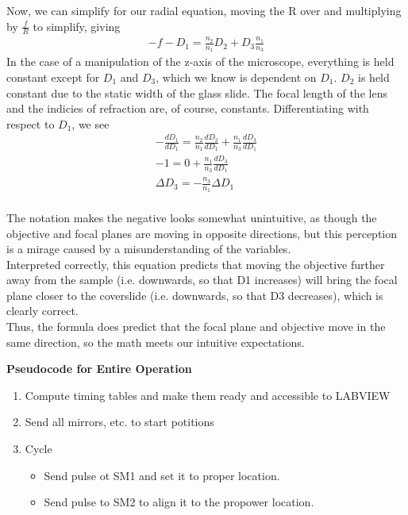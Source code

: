 Now, we can simplify for our radial equation, moving the R over and multiplying by $\frac f R$ to simplify, giving
\begin{gather}
    -f - D_1 = \frac{n_2}{n_1}D_2 + D_3\frac{n_1}{n_3}
\end{gather}
In the case of a manipulation of the z-axis of the microscope,  everything is held constant except for $D_1$ and $D_3$, which we know is dependent on $D_1$. $D_2$ is held constant due to the static width of the glass slide. The focal length of the lens and the indicies of refraction are, of course, constants. Differentiating with respect to $D_1$, we see
\begin{gather}
    -\frac{d D_1}{d D_1} = \frac{n_2}{n_1}\frac{dD_2}{dD_1} + \frac{n_1}{n_3}\frac{dD_3}{dD_1}\\
    -1 = 0+ \frac{n_1}{n_3} \frac{dD_3}{dD_1}\\
     \Delta D_3=-\frac{n_3}{n_1} \Delta D_1 
\end{gather}
\\The notation makes the negative looks somewhat unintuitive, as though the objective and focal planes are moving in opposite directions, but this perception is a mirage caused by a misunderstanding of the variables. 
\\Interpreted correctly, this equation predicts that moving the objective further away from the sample (i.e. downwards, so that D1 increases) will bring the focal plane closer to the coverslide (i.e. downwards, so that D3 decreases), which is clearly correct. \\
Thus, the formula does predict that the focal plane and objective move in the same direction, so the math meets our intuitive expectations.


\newpage
\textbf{Pseudocode for Entire Operation}\\
\begin{enumerate}
    \item Compute timing tables and make them ready and accessible to LABVIEW
    \item Send all mirrors, etc. to start potitions
    \item Cycle
    \begin{itemize}
        \item Send pulse ot SM1 and set it to proper location.
        \item Send pulse to SM2 to align it to the propower location.
    \end{itemize}
\end{enumerate}

